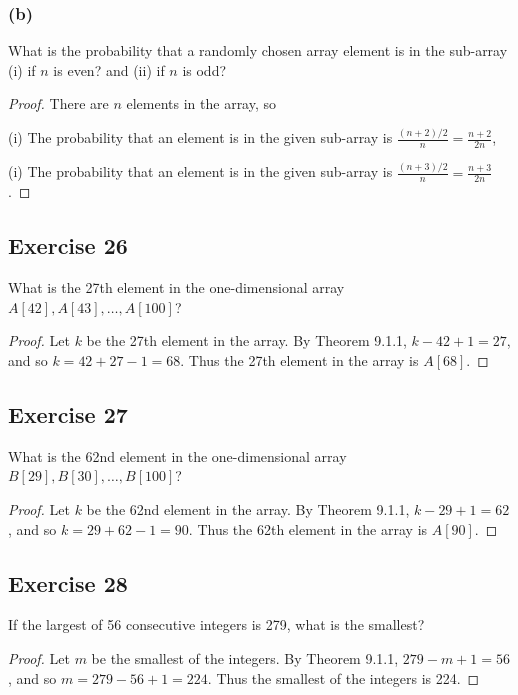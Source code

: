 \documentclass[14pt]{extarticle}
\begin{document}
\subsubsection{(b)}
What is the probability that a randomly chosen array element is in the sub-array (i) if $n$ is even? and
(ii) if $n$ is odd?

\begin{proof}
     There are $n$ elements in the array, so

     (i) The probability that an element is in the given sub-array is \(\frac{(n+2)/2}{n} = \frac{n+2}{2n}\),

     (i) The probability that an element is in the given sub-array is \(\frac{(n+3)/2}{n} = \frac{n+3}{2n}\).
\end{proof}

\subsection{Exercise 26}
What is the 27th element in the one-dimensional array \(A[42], A[43], \ldots, A[100]\)?

\begin{proof}
     Let $k$ be the 27th element in the array. By Theorem 9.1.1, \(k - 42 + 1 = 27\), and so \(k = 42 + 27 - 1 = 68\).
     Thus the 27th element in the array is \(A[68]\).
\end{proof}

\subsection{Exercise 27}
What is the 62nd element in the one-dimensional array \(B[29], B[30], \ldots, B[100]\)?

\begin{proof}
     Let $k$ be the 62nd element in the array. By Theorem 9.1.1, \(k - 29 + 1 = 62\), and so \(k = 29 + 62 - 1 = 90\).
     Thus the 62th element in the array is \(A[90]\).
\end{proof}

\subsection{Exercise 28}
If the largest of 56 consecutive integers is 279, what is the smallest?

\begin{proof}
     Let $m$ be the smallest of the integers. By Theorem 9.1.1, \(279 - m + 1 = 56\), and so \(m = 279 - 56 + 1 = 224\).
     Thus the smallest of the integers is 224.
\end{proof}
\end{document}
